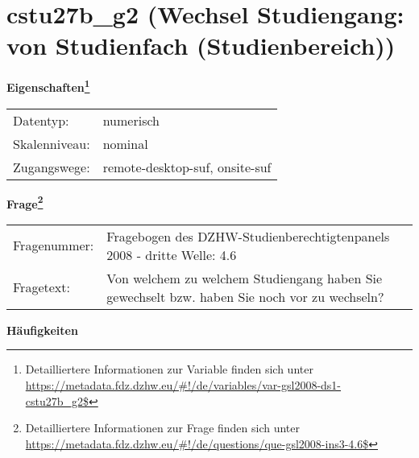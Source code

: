 
    \setcounter{footnote}{0}

    \vspace*{-1.8cm}
	\section{cstu27b\_g2 (Wechsel Studiengang: von Studienfach (Studienbereich))}
	\label{section:cstu27b_g2}



    \vspace*{0.5cm}
    \noindent\textbf{Eigenschaften\footnote{Detailliertere Informationen zur Variable finden sich unter
		\url{https://metadata.fdz.dzhw.eu/\#!/de/variables/var-gsl2008-ds1-cstu27b_g2$}}}\\
	\begin{tabularx}{\hsize}{@{}lX}
	Datentyp: & numerisch \\
	Skalenniveau: & nominal \\
	Zugangswege: &
	  remote-desktop-suf, 
	  onsite-suf
 \\
    \end{tabularx}



				\vspace*{0.5cm}
                \noindent\textbf{Frage\footnote{Detailliertere Informationen zur Frage finden sich unter
		              \url{https://metadata.fdz.dzhw.eu/\#!/de/questions/que-gsl2008-ins3-4.6$}}}\\
				\begin{tabularx}{\hsize}{@{}lX}
					Fragenummer: &
					  Fragebogen des DZHW-Studienberechtigtenpanels 2008 - dritte Welle:
					  4.6
 \\
					Fragetext: & Von welchem zu welchem Studiengang haben Sie gewechselt bzw. haben Sie noch vor zu wechseln? \\
				\end{tabularx}





        		\vspace*{0.5cm}
                \noindent\textbf{Häufigkeiten}


